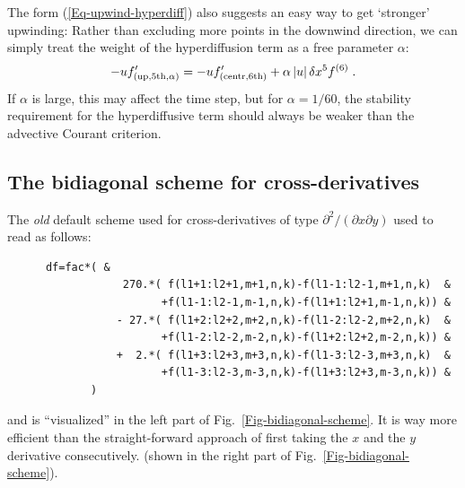 \documentclass[\mydriver,12pt,twoside,notitlepage,a4paper]{article}
\begin{document}
The form (\ref{Eq-upwind-hyperdiff}) also suggests an easy way to get
`stronger' upwinding: Rather than excluding more points in the downwind
direction, we can simply treat the weight of the hyperdiffusion term as a
free parameter $\alpha$:
\begin{equation}
  -u f'_{\rm(up,5th,\alpha)}
  = -u f'_{\rm(centr,6th)}  + \alpha\,|u|\,\delta x^5 f^{(6)} \; .
\end{equation}
If $\alpha$ is large, this may affect the time step, but for
$\alpha=1/60$, the stability requirement for the hyperdiffusive term
should always be weaker than the advective Courant criterion.

\subsection{The bidiagonal scheme for cross-derivatives}
\label{Bidiagonal}

The {\em old} default scheme used for cross-derivatives of type
$\partial^2/(\partial x \partial y)$ used to read as follows:
\begin{verbatim}
      df=fac*( &
                  270.*( f(l1+1:l2+1,m+1,n,k)-f(l1-1:l2-1,m+1,n,k)  &
                        +f(l1-1:l2-1,m-1,n,k)-f(l1+1:l2+1,m-1,n,k)) &
                 - 27.*( f(l1+2:l2+2,m+2,n,k)-f(l1-2:l2-2,m+2,n,k)  &
                        +f(l1-2:l2-2,m-2,n,k)-f(l1+2:l2+2,m-2,n,k)) &
                 +  2.*( f(l1+3:l2+3,m+3,n,k)-f(l1-3:l2-3,m+3,n,k)  &
                        +f(l1-3:l2-3,m-3,n,k)-f(l1+3:l2+3,m-3,n,k)) &
             )
\end{verbatim}
and is ``visualized'' in the left part of Fig.~\ref{Fig-bidiagonal-scheme}.
It is way more efficient than the straight-forward approach of first
taking the $x$ and the $y$ derivative consecutively.
(shown in the right part of Fig.~\ref{Fig-bidiagonal-scheme}).
\end{document}
